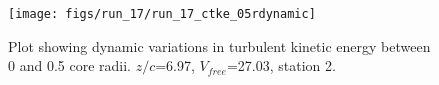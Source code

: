 \begin{figure}[H]
\centering
\texttt{[image: figs/run\_17/run\_17\_ctke\_05rdynamic]}
\caption{Plot showing dynamic variations in turbulent kinetic energy between 0 and 0.5 core radii. $z/c$=6.97, $V_{free}$=27.03, station 2.}
\label{fig:run_17_ctke_05rdynamic}
\end{figure}


